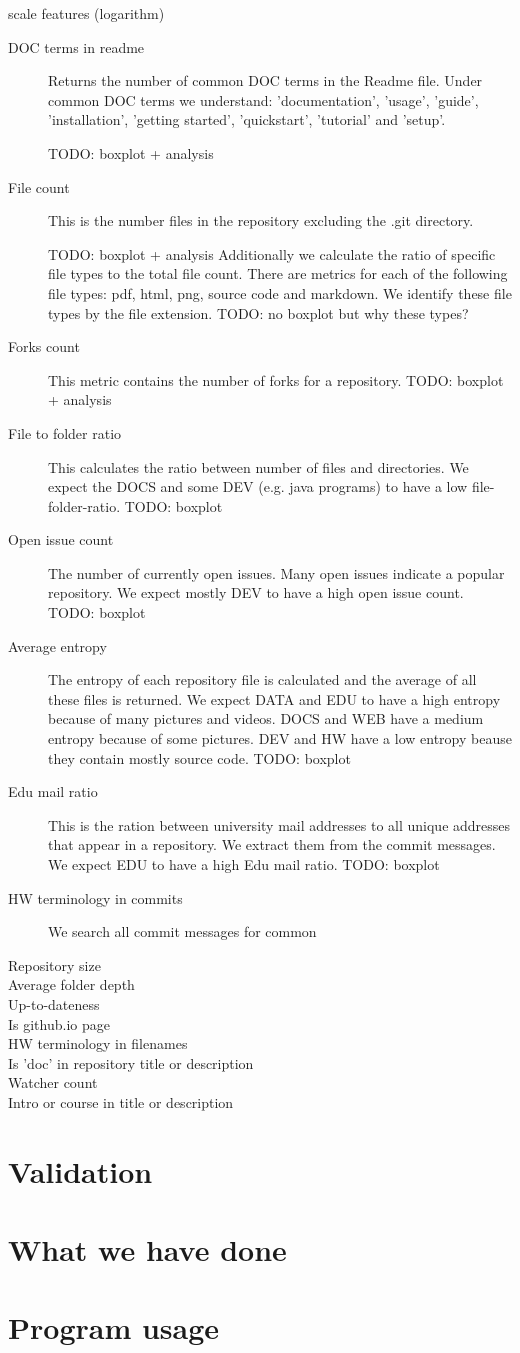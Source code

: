 \documentclass[a4paper]{scrartcl}
\begin{document}
scale features (logarithm)
\begin{description}
	
	\item[DOC terms in readme]
	Returns the number of common DOC terms in the Readme file. Under common DOC terms we understand: 'documentation', 'usage', 'guide', 'installation', 'getting started', 'quickstart', 'tutorial' and 'setup'.
	
	TODO: boxplot + analysis
	\item[File count]
	This is the number files in the repository excluding the .git directory.
	
	TODO: boxplot + analysis
	Additionally we calculate the ratio of specific file types to the total file count. There are metrics for each of the following file types: pdf, html, png, source code and markdown. We identify these file types by the file extension.
	TODO: no boxplot but why these types?
	\item[Forks count]
	This metric contains the number of forks for a repository.
	TODO: boxplot + analysis
	\item[File to folder ratio]
	This calculates the ratio between number of files and directories. We expect the DOCS and some DEV (e.g. java programs) to have a low file-folder-ratio.
	TODO: boxplot
	\item[Open issue count]
	The number of currently open issues. Many open issues indicate a popular repository. We expect mostly DEV to have a high open issue count.
	TODO: boxplot
	\item[Average entropy]
	The entropy of each repository file is calculated and the average of all these files is returned. We expect DATA and EDU to have a high entropy because of many pictures and videos. DOCS and WEB have a medium entropy because of some pictures. DEV and HW have a low entropy beause they contain mostly source code.
	TODO: boxplot
	\item[Edu mail ratio]
	This is the ration between university mail addresses to all unique addresses that appear in a repository. We extract them from the commit messages. We expect EDU to have a high Edu mail ratio.
	TODO: boxplot 
	\item[HW terminology in commits]
	We search all commit messages for common 
	\item[Repository size]
	\item[Average folder depth]
	\item[Up-to-dateness]
	\item[Is github.io page]
	\item[HW terminology in filenames]
	\item[Is 'doc' in repository title or description]
	\item[Watcher count]
	\item[Intro or course in title or description]
	
\end{description}
	

\section{Validation}


\section{What we have done}


\section{Program usage}
\end{document}
